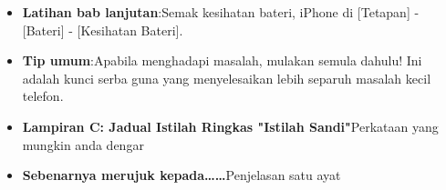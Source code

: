
\begin{itemize}
  \item \textbf{Latihan bab lanjutan}:Semak kesihatan bateri, iPhone di [Tetapan] - [Bateri] - [Kesihatan Bateri].
  \item \textbf{Tip umum}:Apabila menghadapi masalah, mulakan semula dahulu! Ini adalah kunci serba guna yang menyelesaikan lebih separuh masalah kecil telefon.
  \item \textbf{Lampiran C: Jadual Istilah Ringkas "Istilah Sandi"}Perkataan yang mungkin anda dengar
  \item \textbf{Sebenarnya merujuk kepada……}Penjelasan satu ayat
\end{itemize}
